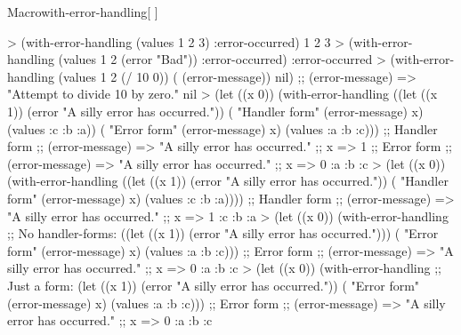 \documentclass[10pt,twoside,english,pdftex]{article}
\begin{document}
\begin{functiondoc}{Macro}{with-error-handling}{[ \vbar{}
    \code{(}\superstar{}\code{)}]
    \superstar{} 
    \returns{} \superstar}
%
\fnexamples
%
\W\supp
\begin{example}
> (with-error-handling (values 1 2 3) :error-occurred)
1
2
3
> (with-error-handling (values 1 2 (error "Bad")) :error-occurred)
:error-occurred
> (with-error-handling (values 1 2 (/ 10 0)) ( (error-message)) nil)
;;  (error-message) => "Attempt to divide 10 by zero."
nil\goodpagebreak
> (let ((x 0)) 
    (with-error-handling 
        ((let ((x 1))
           (error "A silly error has occurred."))
         ( "Handler form" (error-message) x)
         (values :c :b :a))
      ( "Error form" (error-message) x)
      (values :a :b :c)))
;; Handler form
;;  (error-message) => "A silly error has occurred."
;;  x => 1
;; Error form
;;  (error-message) => "A silly error has occurred."
;;  x => 0
:a
:b
:c\goodpagebreak
> (let ((x 0)) 
    (with-error-handling 
        ((let ((x 1))
           (error "A silly error has occurred."))
         ( "Handler form" (error-message) x)
         (values :c :b :a))))
;; Handler form
;;  (error-message) => "A silly error has occurred."
;;  x => 1
:c
:b
:a\goodpagebreak
> (let ((x 0)) 
    (with-error-handling 
        ;; No handler-forms:
        ((let ((x 1))
           (error "A silly error has occurred.")))
      ( "Error form" (error-message) x)
      (values :a :b :c)))
;; Error form
;;  (error-message) => "A silly error has occurred."
;;  x => 0
:a
:b
:c\goodpagebreak
> (let ((x 0)) 
    (with-error-handling 
        ;; Just a form:
        (let ((x 1))
          (error "A silly error has occurred."))
      ( "Error form" (error-message) x)
      (values :a :b :c)))
;; Error form
;;  (error-message) => "A silly error has occurred."
;;  x => 0
:a
:b
:c
\end{example}

\end{functiondoc}

\end{document}
